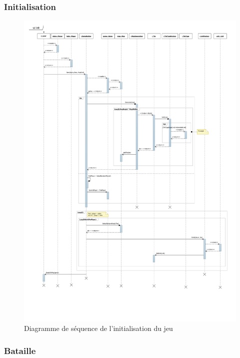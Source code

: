 \subsubsection{Initialisation}

\begin{figure}[h] 
  \centering
  \includegraphics[width=13cm]{schemas/sd_init.png} 
  \caption{Diagramme de séquence de l'initialisation du jeu} 
  \label{sd_init}
\end{figure} 

\subsubsection{Bataille}

